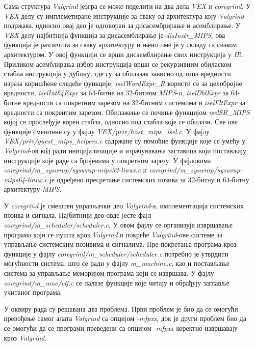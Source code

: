 \documentclass[12pt,oneside]{memoir}
\begin{document}
\indent Сама структура \textit{Valgrind} језгра се може поделити на два дела \textit{VEX} и \textit{coregrind}. У \textit{VEX} делу су имплеметиране инструкције за сваку од архитектура коју \textit{Valgrind} подржава, односно овај део је одговоран за дисасембрирање и асемблирање. У \textit{VEX} делу најбитнија функција за дисасемблирање је \textit{disInstr\_MIPS}, ова функција је различита за сваку архитектуру и њено име је у складу са сваком архитектуром. У овој функцији се врши дисаемблирање свих инструкција у \textit{IR}. Приликом асемблирања избор инструкција врши се рекурзивним обиласком стабла инструкција у дубину, где су за обилазак зависно од типа вредности израза коришћене следеће функције: \textit{iselWordExpr\_R} користи се за целобројне вредности,  \textit{iselInt64Expr} за 64-битне на 32-битном \textit{MIPS}-u, \textit{iselDblExpr} за 64-битне вредности са покретним зарезом на 32-битним системима и \textit{iselFltExpr} за вредности са покрентим зарезом. Обилажење се почиње функцијом \textit{iselSB\_MIPS} којој се прослеђује корен стабла, односно под стабла које се обилази. Све ове функције смештене су у фајлу 
\textit{VEX/priv/\-host\_mips\_isel.c}. У фајлу \textit{VEX/priv/\-guest\_mips\_helpers.c} садржане су помоћне функције које се умећу у \textit{Valgrind}-ов к\^{о}д ради иницијализације и израчунавања заставица који постављају инструкције које раде са бројевима у покретном зарезу. У фајловима \textit{coregrind/m\_syswr\-ap/syswrap-mips32-linux.c} и \textit{coregrind/m\_syswrap\-/syswrap-mips64-linux.c} је одређено пресретање системских позива за 32-битну и 64-битну архитектуру \textit{MIPS}.


\indent У \textit{coregrind} је смештен управљачки део \textit{Valgrind}-а, имплементација системских позива и сигнала. Најбитнији део овде јесте фајл  \textit{coregrind/m\_scheduler/\-scheduler.c}. У овом фајлу се организује извршавање програма који се пушта кроз \textit{Valgrind} и покреће \textit{Valgrind}-ове системе за управљање системским позивима и сигналима. Пре покретања програма кроз функције у фајлу \textit{coregrind/\-m\_scheduler/scheduler.c} потребно је утврдити могућности система, што се ради у фајлу \textit{m\_machine.c}, као и постављање система за управљање меморијом програма који се извршава. У фајлу \textit{coregrind/m\_ume/elf.c} се налазе функције које читају и обрађују заглавље учитаног програма. 

\indent У оквиру рада су решавана два проблема. Први проблем је био да се омогући превођење самог алата \textit{Valgrind} са опцијом \textit{-mfpxx}, док је други проблем био да се омогући да се програми преведени са опцијом \textit{-mfpxx} коректно извршавају кроз \textit{Valgrind}.
\end{document}
